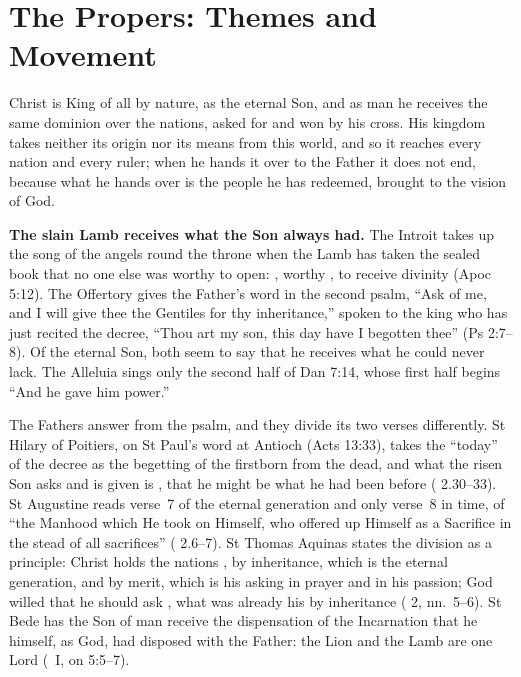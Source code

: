 \section{The Propers: Themes and Movement}

Christ is King of all by nature, as the eternal Son, and as man he receives
the same dominion over the nations, asked for and won by his cross. His
kingdom takes neither its origin nor its means from this world, and so it
reaches every nation and every ruler; when he hands it over to the Father it
does not end, because what he hands over is the people he has redeemed,
brought to the vision of God.

\textbf{The slain Lamb receives what the Son always had.} The Introit takes up
the song of the angels round the throne when the Lamb has taken the sealed
book that no one else was worthy to open: , worthy , to receive divinity (Apoc
5:12). The Offertory gives the Father's word in the second psalm, ``Ask of me,
and I will give thee the Gentiles for thy inheritance,'' spoken to the king
who has just recited the decree, ``Thou art my son, this day have I begotten
thee'' (Ps 2:7--8). Of the eternal Son, both seem to say that he receives what
he could never lack. The Alleluia sings only the second half of Dan 7:14, whose
first half begins ``And he gave him power.''

The Fathers answer from the psalm, and they divide its two verses
differently. St Hilary of Poitiers, on St Paul's word at Antioch (Acts 13:33),
takes the ``today'' of the decree as the begetting of the firstborn from the
dead, and what the risen Son asks and is given is , that he might be what he had been before ( 2.30--33). St Augustine reads verse~7 of the eternal generation and
only verse~8 in time, of ``the Manhood which He took on Himself, who offered up
Himself as a Sacrifice in the stead of all sacrifices'' ( 2.6--7). St Thomas Aquinas states the division as a principle:
Christ holds the nations , by inheritance, which is the eternal generation, and by merit,
which is his asking in prayer and in his passion; God willed that he should
ask , what was already his by
inheritance ( 2, nn.~5--6). St Bede has the Son of man receive the dispensation of the Incarnation
that he himself, as God, had disposed with the Father: the Lion and the Lamb
are one Lord (\ I, on 5:5--7).

